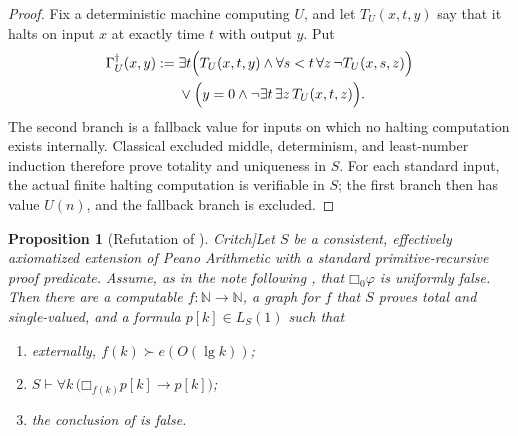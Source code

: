\documentclass[11pt]{article}
\newtheorem{proposition}[theorem]{Proposition}
\theoremstyle{definition}
\theoremstyle{remark}
\newcommand{\N}{\mathbb{N}}
\newcommand{\Boxb}[1]{\mathord{\Box}_{#1}}
\newcommand{\CritchPBLRef}{\cite[Theorem~4.2]{Critch}}
\begin{document}
\begin{proof}
Fix a deterministic machine computing $U$, and let $T_U(x,t,y)$ say that it halts on input $x$ at exactly time $t$ with output $y$.  Put
\[
\begin{split}
\Gamma_U^{\dagger}(x,y):={}&
\exists t\Bigl(T_U(x,t,y)\wedge
  \forall s<t\,\forall z\,\neg T_U(x,s,z)\Bigr)\\
&\vee\Bigl(y=0\wedge\neg\exists t\,\exists z\,T_U(x,t,z)\Bigr).
\end{split}
\]
The second branch is a fallback value for inputs on which no halting computation exists internally.  Classical excluded middle, determinism, and least-number induction therefore prove totality and uniqueness in $S$.  For each standard input, the actual finite halting computation is verifiable in $S$; the first branch then has value $U(n)$, and the fallback branch is excluded.
\end{proof}

\begin{proposition}[Refutation of \CritchPBLRef]\label{prop:failure}
Let $S$ be a consistent, effectively axiomatized extension of Peano Arithmetic with a standard primitive-recursive proof predicate.  Assume, as in the note following \CritchPBLRef, that $\Boxb{0}\varphi$ is uniformly false.  Then there are a computable $f:\N\to\N$, a graph for $f$ that $S$ proves total and single-valued, and a formula $p[k]\in L_S(1)$ such that
\begin{enumerate}[label=\textup{(\roman*)},leftmargin=2.1em]
  \item externally, $f(k)\succ e(O(\lg k))$;
  \item $S\vdash\forall k\,\bigl(\Boxb{f(k)}p[k]\to p[k]\bigr)$;
  \item the conclusion of \CritchPBLRef{} is false.
\end{enumerate}
\end{proposition}
\end{document}
